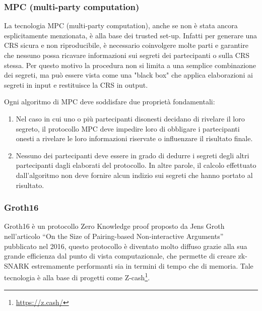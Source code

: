 \subsubsection{MPC (multi-party computation)}
La tecnologia MPC (multi-party computation), anche se non è stata ancora esplicitamente menzionata, è alla base dei
trusted set-up. Infatti per generare una CRS sicura e non riproducibile, è necessario coinvolgere molte parti e
garantire che nessuno possa ricavare informazioni sui segreti dei partecipanti o sulla CRS stessa. Per questo motivo la
procedura non si limita a una semplice combinazione dei segreti, ma può essere vista come una "black box" che applica
elaborazioni ai segreti in input e restituisce la CRS in output.

Ogni algoritmo di MPC deve soddisfare due proprietà fondamentali:

\begin{enumerate}
    \item Nel caso in cui uno o più partecipanti disonesti decidano di rivelare il loro segreto, il protocollo MPC deve
    impedire loro di obbligare i partecipanti onesti a rivelare le loro informazioni riservate o influenzare il risultato
    finale.
    \item Nessuno dei partecipanti deve essere in grado di dedurre i segreti degli altri partecipanti dagli elaborati
    del protocollo. In altre parole, il calcolo effettuato dall'algoritmo non deve fornire alcun indizio sui segreti che
    hanno portato al risultato.
\end{enumerate}

\subsubsection{Groth16}
Groth16 è un protocollo Zero Knowledge proof proposto da Jens Groth nell’articolo “On the Size of Pairing-based
Non-interactive Arguments” \cite{10.1007/978-3-662-49896-5_11} pubblicato nel 2016, questo protocollo è diventato molto
diffuso grazie alla sua grande efficienza dal punto di vista computazionale, che permette di creare zk-SNARK
estremamente performanti sia in termini di tempo che di memoria. Tale tecnologia è alla base di progetti come Z-cash\footnote{\url{https://z.cash/}}.

